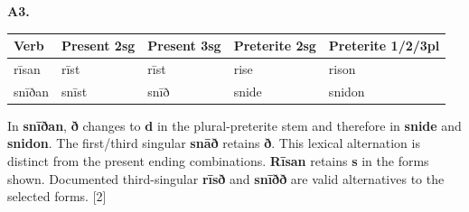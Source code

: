 \par\begin{minipage}{\linewidth}\raggedright
\textbf{A3.}

\par\begingroup
\fontsize{10.5}{13.2}\selectfont
\setlength{\LTleft}{0pt}\setlength{\LTright}{\fill}
\noindent
\begin{tabular}{@{}>{\raggedright\arraybackslash}p{21.11mm}>{\raggedright\arraybackslash}p{21.11mm}>{\raggedright\arraybackslash}p{21.11mm}>{\raggedright\arraybackslash}p{22.8mm}>{\raggedright\arraybackslash}p{26.6mm}@{}}
\toprule
\textbf{Verb} & \textbf{Present 2sg} & \textbf{Present 3sg} & \textbf{Preterite 2sg} & \textbf{Preterite 1/\allowbreak{}2/\allowbreak{}3pl} \\
\midrule
rīsan & rīst & rīst & rise & rison \\
snīðan & snīst & snīð & snide & snidon \\
\bottomrule
\end{tabular}
\par\endgroup

In \textbf{snīðan}, \textbf{ð} changes to \textbf{d} in the plural-preterite stem and therefore in \textbf{snide} and \textbf{snidon}. The first/\allowbreak{}third singular \textbf{snāð} retains \textbf{ð}. This lexical alternation is distinct from the present ending combinations. \textbf{Rīsan} retains \textbf{s} in the forms shown. Documented third-singular \textbf{rīsð} and \textbf{snīðð} are valid alternatives to the selected forms. [2]

\end{minipage}\par\addvspace{4pt}

